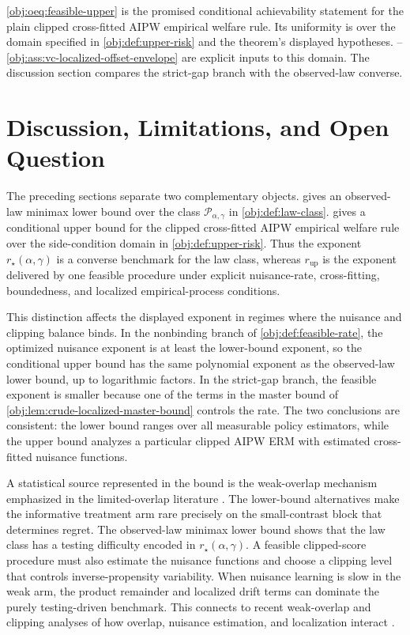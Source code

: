 \documentclass[11pt]{article}
\begin{document}
\cref{obj:oeq:feasible-upper} is the promised conditional achievability statement for the plain clipped cross-fitted AIPW empirical welfare rule.  Its uniformity is over the domain specified in \cref{obj:def:upper-risk} and the theorem's displayed hypotheses.  --\cref{obj:ass:vc-localized-offset-envelope} are explicit inputs to this domain.  The discussion section compares the strict-gap branch with the observed-law converse.


\section{Discussion, Limitations, and Open Question}

The preceding sections separate two complementary objects.   gives an observed-law minimax lower bound over the class \(\mathcal P_{\alpha,\gamma}\) in \cref{obj:def:law-class}.   gives a conditional upper bound for the clipped cross-fitted AIPW empirical welfare rule over the side-condition domain in \cref{obj:def:upper-risk}.  Thus the exponent \(r_\star(\alpha,\gamma)\) is a converse benchmark for the law class, whereas \(r_{\mathrm{up}}\) is the exponent delivered by one feasible procedure under explicit nuisance-rate, cross-fitting, boundedness, and localized empirical-process conditions.

This distinction affects the displayed exponent in regimes where the nuisance and clipping balance binds.  In the nonbinding branch of \cref{obj:def:feasible-rate}, the optimized nuisance exponent is at least the lower-bound exponent, so the conditional upper bound has the same polynomial exponent as the observed-law lower bound, up to logarithmic factors.  In the strict-gap branch, the feasible exponent is smaller because one of the terms in the master bound of \cref{obj:lem:crude-localized-master-bound} controls the rate.  The two conclusions are consistent: the lower bound ranges over all measurable policy estimators, while the upper bound analyzes a particular clipped AIPW ERM with estimated cross-fitted nuisance functions.

A statistical source represented in the bound is the weak-overlap mechanism emphasized in the limited-overlap literature \citep{Li2016,DAmour2017,BenMichael2022,Hill2024,Susmann2025}.  The lower-bound alternatives make the informative treatment arm rare precisely on the small-contrast block that determines regret.  The observed-law minimax lower bound shows that the law class has a testing difficulty encoded in \(r_\star(\alpha,\gamma)\).  A feasible clipped-score procedure must also estimate the nuisance functions and choose a clipping level that controls inverse-propensity variability.  When nuisance learning is slow in the weak arm, the product remainder and localized drift terms can dominate the purely testing-driven benchmark.  This connects to recent weak-overlap and clipping analyses of how overlap, nuisance estimation, and localization interact \citep{Zhao2023,Liu2026}.
\end{document}
